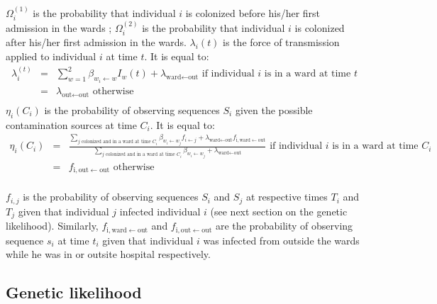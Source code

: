 \documentclass[10pt]{article}
\begin{document}
$\Omega_i^{\left(1\right)}$ is the probability that individual $i$ is colonized before his/her first admission in the wards ; $\Omega_i^{\left(2\right)}$ is the probability that individual $i$ is colonized after his/her first admission in the wards. 
$\lambda_i\left(t\right)$ is the force of transmission applied to individual $i$ at time $t$. It is equal to: 
\begin{eqnarray*}
\lambda_i^{\left(t\right)} & = & \sum_{w=1}^{2} \beta_{w_i \leftarrow w} I_w\left(t\right) + \lambda_{\text{ward} \leftarrow \text{out}} \text{ if individual $i$ is in a ward at time $t$}  \\
 & = & \lambda_{\text{out} \leftarrow \text{out}} \text{ otherwise}\\
\end{eqnarray*}
\bigskip
$\eta_i\left(C_i\right)$ is the probability of observing sequences $S_i$ given the possible contamination sources at time $C_i$. It is equal to: 
\begin{eqnarray*}
\eta_i\left(C_i\right) & = & \frac{\sum_{\text{$j$ colonized and in a ward at time $C_i$}} \beta_{w_i \leftarrow w_j} f_{i \leftarrow j} + \lambda_{\text{ward} \leftarrow \text{out}}f_{\text{i},\text{ward} \leftarrow \text{out}} }{\sum_{\text{$j$ colonized and in a ward at time $C_i$}} \beta_{w_i \leftarrow w_j} + \lambda_{\text{ward} \leftarrow \text{out}} } \text{ if individual $i$ is in a ward at time $C_i$}  \\
 & = & f_{\text{i},\text{out} \leftarrow \text{out}} \text{ otherwise}\\
\end{eqnarray*}
\bigskip

$f_{i,j}$ is the probability of observing sequences $S_i$ and $S_j$ at respective times $T_i$ and $T_j$ given that individual $j$ infected individual $i$ (see next section on the genetic likelihood). Similarly, $f_{\text{i},\text{ward} \leftarrow \text{out}}$ and $f_{\text{i},\text{out} \leftarrow \text{out}}$ are the probability of observing sequence $s_i$ at time $t_i$ given that individual $i$ was infected from outside the wards while he was in or outsite hospital respectively. 


\subsection*{Genetic likelihood}

\end{document}
